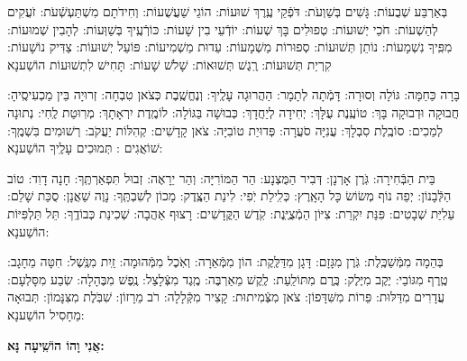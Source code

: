 \documentclass[twoside, openany, parskip=half, 11pt]{book}
\begin{document}
 בְּאַרְבַּע שְׁבֻעוֹת: גָּשִׁים בְּשַׁוְעֹת: דֹּפְֿקֵי עֶֽרֶךְ שׁוּעוֹת: הוֹגֵי שַׁעֲשֻׁעוֹת: וְחִידֹתָם מִשְׁתַּעְשְֿׁעֹת: זֹעֲקִים לְהַשְׁעוֹת: חֹכֵי יְשׁוּעוֹת: טְפוּלִים בָּךְ שְׁעוֹת: יוֹדְֿעֵי בִין שָׁעוֹת: כּוֹרְֿעֶֽיךָ בְּשַׁוְּעוֹת: לְהָבִין שְׁמוּעוֹת: מִפִּֽיךָ נִשְׁמָעוֹת: נוֹתֵן תְּשׁוּעוֹת: סְפוּרוֹת מַשְׁמָעוֹת: עֵדוּת מַשְׁמִיעוֹת: פּוֹעֵל יְשׁוּעוֹת: צַדִּיק נוֹשָׁעוֹת: קִרְיַת תְּשׁוּעוֹת: רֶֽגֶשׁ תְּשׁוּאוֹת:
  שָׁלֹשׁ שָׁעוֹת:
   תָּחִישׁ לִתְשׁוּעוֹת הוֹשַׁענָא 



בָּרָה כַּחַמָּה: גּוֹלָה וְסוּרָה: דָּמְֿתָה לְתָמָר: הַהֲרוּגָה עָלֶֽיךָ: וְנֶחֱשֶֽׁבֶת כְּצֹאן טִבְחָה: זְרוּיָה בֵּין מַכְעִיסֶֽיהָ: חֲבוּקָה וּדְבוּקָה בָּךְ: טוֹעֶֽנֶת עֻלָּךְ: יְחִידָה לְיַחֲדָךְ: כְּבוּשָׁה בַּגּוֹלָה: לוֹמֶֽדֶת יִרְאָתָךְ: מְרֽוּטַת לֶֽחִי: נְתוּנָה לְמַכִים: סוֹבֶֽלֶת סִבְלָךְ: עֲנִיָּה סֹעֲרָה: פְּדוּיַת טוֹבִיָּה: צֹאן קָדָשִׁים: קְהִלּוֹת יַעֲקֹב: רְשׁוּמִים בִּשְׁמֶֽךָ:
 שׁוֹאֲגִים :
 תְּמוּכִים עָלֶֽיךָ הוֹשַׁענָא:


 בֵּית הַבְּֿחִירָה: גֹּֽרֶן אָרְנָן: דְּבִיר הַמֻּצְנָע: הַר הַמּוֹרִיָּה: וְהַר יֵרָאֶה: זְבוּל תִּפְאַרְתֶּֽךָ: חָנָה דָוִד: טוֹב הַלְּֿבָנוֹן: יְפֵה נוֹף מְשׂוֹשׂ כָּל הָאָֽרֶץ: כְּלִֽילַת יֹֽפִי: לִינַת הַצֶּֽדֶק: מָכוֹן לְשִׁבְתֶּֽךָ: נָוֶה שַׁאֲנָן: סֻכַּת שָׁלֵם: עַלִיַּת שְׁבָטִים: פִּנַּת יִקְרַת: צִיּוֹן הַמְֿצֻיֶּֽנֶת: קֹֽדֶשׁ הַקֳּדָשִׁים: רָצוּף אַהֲבָה:
  שְׁכִינַת כְּבוֹדֶֽךָ:
   תֵּל תַּלְפִּיּוֹת הוֹשַׁענָא:


 בְּהֵמָה מִמְּֿשַׁכֶּֽלֶת: גֹּֽרֶן מִגָּזָם: דָּגָן מִדַּלֶּֽקֶת: הוֹן מִמְּֿאֵרָה: וְאֹֽכֶל מִמְּֿהוּמָה: זַֽיִת מִנֶּֽשֶׁל: חִטָּה מֵחָגָב: טֶֽרֶף מִגּוֹבַי: יֶקֶב מִיֶּלֶק: כֶּֽרֶם מִתּוֹלַֽעַת: לֶֽקֶשׁ מֵאַרְבֶּה: מֶֽגֶד מִצְּֿלָצַל: נֶֽפֶשׁ מִבֶּהָלָה: שֽׂבַע מִסָּלְעָם: עֲדָרִים מִדַּלּוּת: פֵּרוֹת מִשִּׁדָּפוֹן: צֹאן מִצְּֿמִיתוּת: קָצִיר מִקְּֿלָלָה: רֹב מֵרָזוֹן:
  שִׁבֹּֽלֶת מִצִּנָּמוֹן:
   תְּבוּאָה מֵחָסִיל הוֹשַׁענָא:


\label{ani vho}
\begin{large}
\textbf{אֲנִי וָהוֹ הוֹשִֽׁיעָה נָּא:}
\end{large}
\end{document}
